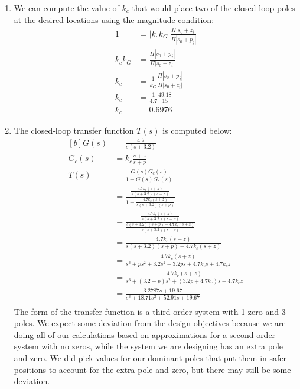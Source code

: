 \documentclass[12pt]{article}
\begin{document}
\begin{enumerate}
    \item %
    We can compute the value of $k_c$ that would place two of the closed-loop poles at the desired locations using the magnitude condition:
    \begin{equation*}
    \begin{aligned}
        1 &= |k_c k_G| \frac{\Pi |s_0 + z_i|}{\Pi |s_0 + p_j|} \\
        k_c k_G &= \frac{\Pi |s_0 + p_j|}{\Pi |s_0 + z_i|} \\
        k_c &= \frac{1}{k_G} \frac{\Pi |s_0 + p_j|}{\Pi |s_0 + z_i|} \\
        k_c &= \frac{1}{4.7} \frac{49.18}{15} \\
        k_c &= 0.6976
    \end{aligned}
    \end{equation*}

    \item %
    The closed-loop transfer function $T(s)$ is computed below:
    \begin{equation*}
    \begin{aligned}[b]
        G(s) &= \frac{4.7}{s(s + 3.2)} \\
        G_c(s) &= k_c\frac{s + z}{s + p} \\
        T(s) &= \frac{G(s)G_c(s)}{1 + G(s)G_c(s)} \\
        &= \frac{\frac{4.7 k_c (s + z)}{s(s + 3.2)(s + p)}}{1 + \frac{4.7 k_c (s + z)}{s(s + 3.2)(s + p)}} \\
        &= \frac{\frac{4.7 k_c (s + z)}{s(s + 3.2)(s + p)}}{\frac{s(s + 3.2)(s + p) + 4.7 k_c (s + z)}{s(s + 3.2)(s + p)}} \\
        &= \frac{4.7 k_c (s + z)}{s(s + 3.2)(s + p) + 4.7 k_c (s + z)} \\
        &= \frac{4.7 k_c (s + z)}{s^3 + ps^2 + 3.2s^2 + 3.2 p s + 4.7 k_c s + 4.7 k_c z} \\
        &= \frac{4.7 k_c (s + z)}{s^3 + (3.2 + p)s^2 + (3.2 p + 4.7 k_c)s + 4.7 k_c z} \\
        &= \frac{3.2787 s + 19.67}{s^3 + 18.71s^2 + 52.91s + 19.67} \\
    \end{aligned}
    \end{equation*}
    The form of the transfer function is a third-order system with 1 zero and 3 poles. We expect some deviation from the design objectives because we are doing all of our calculations based on approximations for a second-order system with no zeros, while the system we are designing has an extra pole and zero. We did pick values for our dominant poles that put them in safer positions to account for the extra pole and zero, but there may still be some deviation.


\end{enumerate}
\end{document}
